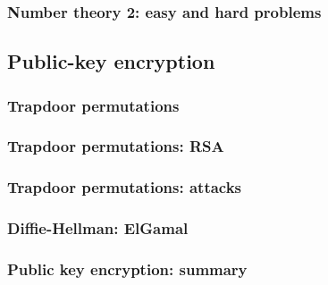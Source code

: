 \documentclass[10pt,a4paper]{report}
\begin{document}
\section{Number theory 2: easy and hard problems}

\chapter{Public-key encryption}

\section{Trapdoor permutations}
\section{Trapdoor permutations: RSA}
\section{Trapdoor permutations: attacks}
\section{Diffie-Hellman: ElGamal}
\section{Public key encryption: summary}

\part{}
\end{document}
